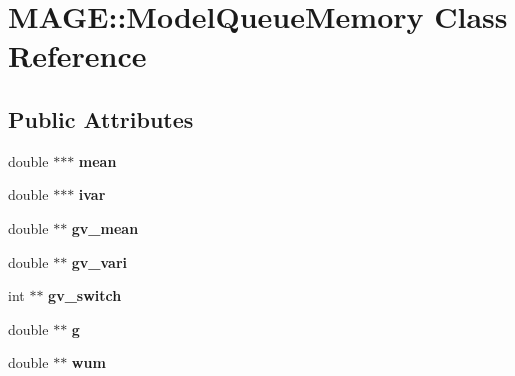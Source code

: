 \hypertarget{class_m_a_g_e_1_1_model_queue_memory}{\section{M\-A\-G\-E\-:\-:Model\-Queue\-Memory Class Reference}
\label{class_m_a_g_e_1_1_model_queue_memory}
}
\subsection*{Public Attributes}
\begin{DoxyCompactItemize}
\item 
\hypertarget{class_m_a_g_e_1_1_model_queue_memory_a6831d4cdf1472693fc85f4d3c53ea7f4}{double $\ast$$\ast$$\ast$ {\bfseries mean}}\label{class_m_a_g_e_1_1_model_queue_memory_a6831d4cdf1472693fc85f4d3c53ea7f4}

\item 
\hypertarget{class_m_a_g_e_1_1_model_queue_memory_a636545600f4ee5360b7d9782c9042744}{double $\ast$$\ast$$\ast$ {\bfseries ivar}}\label{class_m_a_g_e_1_1_model_queue_memory_a636545600f4ee5360b7d9782c9042744}

\item 
\hypertarget{class_m_a_g_e_1_1_model_queue_memory_ad80de821c46d9cf83e0659cb3042bf3e}{double $\ast$$\ast$ {\bfseries gv\-\_\-mean}}\label{class_m_a_g_e_1_1_model_queue_memory_ad80de821c46d9cf83e0659cb3042bf3e}

\item 
\hypertarget{class_m_a_g_e_1_1_model_queue_memory_a1d4e17199ea97e1b4a11c7d20e7151f0}{double $\ast$$\ast$ {\bfseries gv\-\_\-vari}}\label{class_m_a_g_e_1_1_model_queue_memory_a1d4e17199ea97e1b4a11c7d20e7151f0}

\item 
\hypertarget{class_m_a_g_e_1_1_model_queue_memory_a3ef2b07a2bec7fac84e5adb6ac1ca249}{int $\ast$$\ast$ {\bfseries gv\-\_\-switch}}\label{class_m_a_g_e_1_1_model_queue_memory_a3ef2b07a2bec7fac84e5adb6ac1ca249}

\item 
\hypertarget{class_m_a_g_e_1_1_model_queue_memory_a9e55a05bc4a9545bfd7af6238843a6e9}{double $\ast$$\ast$ {\bfseries g}}\label{class_m_a_g_e_1_1_model_queue_memory_a9e55a05bc4a9545bfd7af6238843a6e9}

\item 
\hypertarget{class_m_a_g_e_1_1_model_queue_memory_ae7bad2f0e36ec2ca981f4516d2ee98eb}{double $\ast$$\ast$ {\bfseries wum}}\label{class_m_a_g_e_1_1_model_queue_memory_ae7bad2f0e36ec2ca981f4516d2ee98eb}


\end{DoxyCompactItemize}
